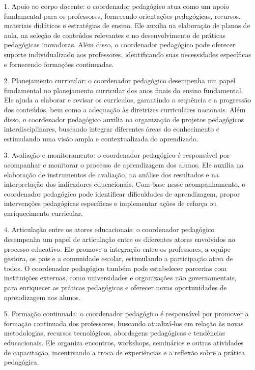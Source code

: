 1. Apoio ao corpo docente: o coordenador pedagógico atua como um apoio fundamental para os professores, fornecendo orientações pedagógicas, recursos, materiais didáticos e estratégias de ensino. Ele auxilia na elaboração de planos de aula, na seleção de conteúdos relevantes e no desenvolvimento de práticas pedagógicas inovadoras. Além disso, o coordenador pedagógico pode oferecer suporte individualizado aos professores, identificando suas necessidades específicas e fornecendo formações continuadas.

2. Planejamento curricular: o coordenador pedagógico desempenha um papel fundamental no planejamento curricular dos anos finais do ensino fundamental. Ele ajuda a elaborar e revisar os currículos, garantindo a sequência e a progressão dos conteúdos, bem como a adequação às diretrizes curriculares nacionais. Além disso, o coordenador pedagógico auxilia na organização de projetos pedagógicos interdisciplinares, buscando integrar diferentes áreas do conhecimento e estimulando uma visão ampla e contextualizada do aprendizado.

3. Avaliação e monitoramento: o coordenador pedagógico é responsável por acompanhar e monitorar o processo de aprendizagem dos alunos. Ele auxilia na elaboração de instrumentos de avaliação, na análise dos resultados e na interpretação dos indicadores educacionais. Com base nesse acompanhamento, o coordenador pedagógico pode identificar dificuldades de aprendizagem, propor intervenções pedagógicas específicas e implementar ações de reforço ou enriquecimento curricular.

4. Articulação entre os atores educacionais: o coordenador pedagógico desempenha um papel de articulação entre os diferentes atores envolvidos no processo educativo. Ele promove a integração entre os professores, a equipe gestora, os pais e a comunidade escolar, estimulando a participação ativa de todos. O coordenador pedagógico também pode estabelecer parcerias com instituições externas, como universidades e organizações não governamentais, para enriquecer as práticas pedagógicas e oferecer novas oportunidades de aprendizagem aos alunos.

5. Formação continuada: o coordenador pedagógico é responsável por promover a formação continuada dos professores, buscando atualizá-los em relação às novas metodologias, recursos tecnológicos, abordagens pedagógicas e tendências educacionais. Ele organiza encontros, workshops, seminários e outras atividades de capacitação, incentivando a troca de experiências e a reflexão sobre a prática pedagógica.

